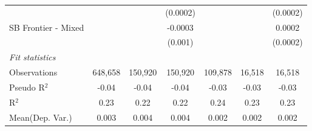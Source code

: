 \begin{tabular}{lcccccc}
                        &               &               & (0.0002)        &               &               & (0.0002)\\   
   SB Frontier - Mixed  &               &               & -0.0003         &               &               & 0.0002\\   
                        &               &               & (0.001)         &               &               & (0.0002)\\   
   \midrule
   \emph{Fit statistics}\\
   Observations         & 648,658       & 150,920       & 150,920         & 109,878       & 16,518        & 16,518\\  
   Pseudo R$^2$         & -0.04         & -0.04         & -0.04           & -0.03         & -0.03         & -0.03\\  
   R$^2$                & 0.23          & 0.22          & 0.22            & 0.24          & 0.23          & 0.23\\  
Mean(Dep. Var.) & 0.003 & 0.004 & 0.004 & 0.002 & 0.002 & 0.002 \\
   

\end{tabular}
